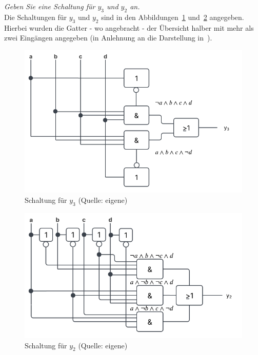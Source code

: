 \textit{Geben Sie eine Schaltung für $y_3$ und $y_2$ an.}\\


\noindent
Die Schaltungen für $y_3$ und $y_2$ sind in den Abbildungen~\ref{fig:schaltplan_y3} und~\ref{fig:schaltplan_y2} angegeben.
Hierbei wurden die Gatter - wo angebracht - der Übersicht halber mit mehr als zwei Eingängen angegeben (in Anlehnung an die Darstellung in~\cite[\textbf{Abbildung 24}, 57]{BL22}).

\begin{figure}
    \centering
    \includegraphics[scale=0.5]{aufgabe 2/img/schaltplan_y3}
    \caption{Schaltung für $y_3$ (Quelle: eigene)}
    \label{fig:schaltplan_y3}
\end{figure}


\begin{figure}
    \centering
    \includegraphics[scale=0.52]{aufgabe 2/img/schaltplan_y2}
    \caption{Schaltung für $y_2$ (Quelle: eigene)}
    \label{fig:schaltplan_y2}
\end{figure}

